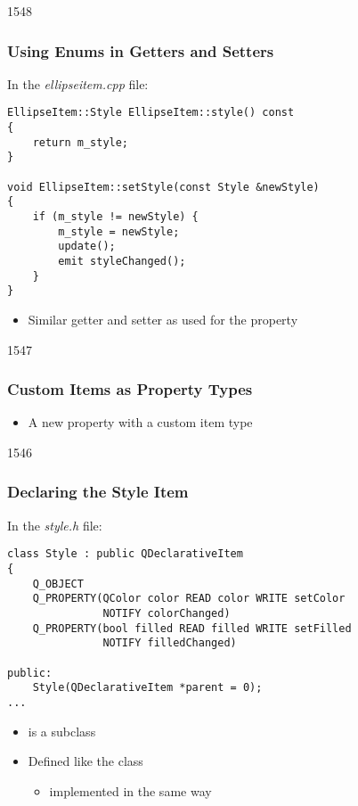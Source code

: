 \begin{slide}[fragile]{1548}\frametitle{Using Enums in Getters and Setters}

In the \textit{ellipseitem.cpp} file:

\vspace*{0.25em}
\begin{lstlisting}
EllipseItem::Style EllipseItem::style() const
{
    return m_style;
}

void EllipseItem::setStyle(const Style &newStyle)
{
    if (m_style != newStyle) {
        m_style = newStyle;
        update();
        emit styleChanged();
    }
}
\end{lstlisting}

\begin{itemize}
\item Similar getter and setter as used for the  property
\end{itemize}

\end{slide}

\begin{slide}[fragile]{1547}\frametitle{Custom Items as Property Types}


\begin{itemize}
\item A new  property with a custom item type
\end{itemize}

\end{slide}

\begin{slide}[fragile]{1546}\frametitle{Declaring the Style Item}

In the \textit{style.h} file:

\vspace*{0.5em}
\begin{lstlisting}
class Style : public QDeclarativeItem
{
    Q_OBJECT
    Q_PROPERTY(QColor color READ color WRITE setColor
               NOTIFY colorChanged)
    Q_PROPERTY(bool filled READ filled WRITE setFilled
               NOTIFY filledChanged)

public:
    Style(QDeclarativeItem *parent = 0);
...
\end{lstlisting}

\begin{itemize}
\item {} is a  subclass
\item Defined like the  class
  \begin{itemize}
  \item implemented in the same way
  \end{itemize}
\end{itemize}

\end{slide}

